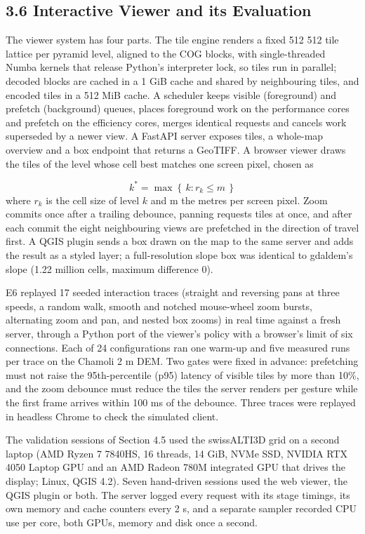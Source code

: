 \documentclass[10pt,a4paper]{article}
\begin{document}
\subsection*{3.6 Interactive Viewer and its Evaluation}
The viewer system has four parts. The tile engine renders a fixed 512 \texttimes{} 512 tile lattice per pyramid level, aligned to the COG blocks, with single-threaded Numba kernels that release Python's interpreter lock, so tiles run in parallel; decoded blocks are cached in a 1 GiB cache and shared by neighbouring tiles, and encoded tiles in a 512 MiB cache. A scheduler keeps visible (foreground) and prefetch (background) queues, places foreground work on the performance cores and prefetch on the efficiency cores, merges identical requests and cancels work superseded by a newer view. A FastAPI server exposes tiles, a whole-map overview and a box endpoint that returns a GeoTIFF. A browser viewer draws the tiles of the level whose cell best matches one screen pixel, chosen as

\begin{equation}k^{*}=\max\left\{\,k : r_{k}\le m\,\right\}\end{equation}
where $r_k$ is the cell size of level $k$ and m the metres per screen pixel. Zoom commits once after a trailing debounce, panning requests tiles at once, and after each commit the eight neighbouring views are prefetched in the direction of travel first. A QGIS plugin sends a box drawn on the map to the same server and adds the result as a styled layer; a full-resolution slope box was identical to gdaldem's slope (1.22 million cells, maximum difference 0).

E6 replayed 17 seeded interaction traces (straight and reversing pans at three speeds, a random walk, smooth and notched mouse-wheel zoom bursts, alternating zoom and pan, and nested box zooms) in real time against a fresh server, through a Python port of the viewer's policy with a browser's limit of six connections. Each of 24 configurations ran one warm-up and five measured runs per trace on the Chamoli 2 m DEM. Two gates were fixed in advance: prefetching must not raise the 95th-percentile (p95) latency of visible tiles by more than 10\%, and the zoom debounce must reduce the tiles the server renders per gesture while the first frame arrives within 100 ms of the debounce. Three traces were replayed in headless Chrome to check the simulated client.

The validation sessions of Section 4.5 used the swissALTI3D grid on a second laptop (AMD Ryzen 7 7840HS, 16 threads, 14 GiB, NVMe SSD, NVIDIA RTX 4050 Laptop GPU and an AMD Radeon 780M integrated GPU that drives the display; Linux, QGIS 4.2). Seven hand-driven sessions used the web viewer, the QGIS plugin or both. The server logged every request with its stage timings, its own memory and cache counters every 2 s, and a separate sampler recorded CPU use per core, both GPUs, memory and disk once a second.
\end{document}
